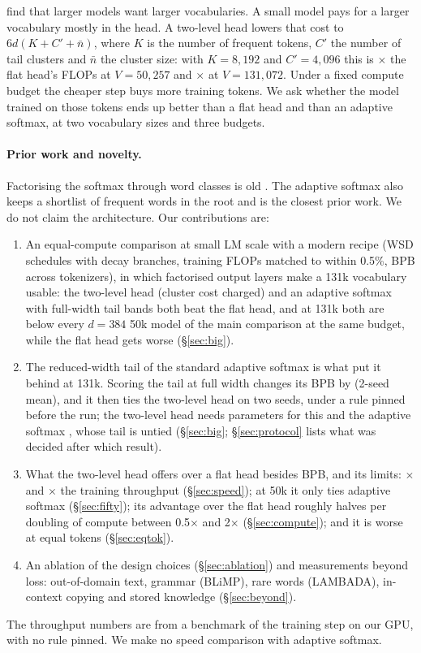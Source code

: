 \documentclass[11pt]{article}
\theoremstyle{remark}
\begin{document}
\citet{tao2024scaling} find that larger models want larger vocabularies. A small model
pays for a larger vocabulary mostly in the head. A two-level head lowers that cost to $6d(K + C' + \bar n)$, where $K$ is the
number of frequent tokens, $C'$ the number of tail clusters and $\bar n$ the cluster size: with $K = 8{,}192$ and $C' = 4{,}096$
this is \HeadRatioFifty{}$\times$ the flat head's FLOPs at $V = 50{,}257$ and \HeadRatioBig{}$\times$ at $V = 131{,}072$. Under
a fixed compute budget the cheaper step buys more training tokens. We ask whether the model trained on those tokens ends up
better than a flat head and than an adaptive softmax, at two vocabulary sizes and three budgets.

\paragraph{Prior work and novelty.} Factorising the softmax through word classes is old \citep{goodman2001classes,
morin2005hierarchical}. The adaptive softmax \citep{grave2017efficient} also keeps a shortlist of frequent words in the root and
is the closest prior work. We do not claim the architecture. Our contributions are:
\begin{enumerate}
  \item An equal-compute comparison at small LM scale with a modern recipe (WSD schedules with decay branches, training FLOPs
  matched to within 0.5\%, BPB across tokenizers), in which factorised output layers make a 131k vocabulary usable: the two-level
  head (cluster cost charged) and an adaptive softmax with full-width tail bands both beat the flat head, and at 131k both are below
  every $d=384$ 50k model of the main comparison at the same budget, while the flat head gets worse (\S\ref{sec:big}).
  \item The reduced-width tail of the standard adaptive softmax is what put it behind at 131k. Scoring the tail at full width
  changes its BPB by \BigWidMean{} (2-seed mean), and it then ties the two-level head on two seeds, under a rule pinned before the run; the
  two-level head needs \ParamsTlBig{} parameters for this and the adaptive softmax \ParamsAsBigW{}, whose tail is untied (\S\ref{sec:big};
  \S\ref{sec:protocol} lists what was decided after which result).
  \item What the two-level head offers over a flat head besides BPB, and its limits: \PerfRatioFifty{}$\times$ and
  \PerfRatioBig{}$\times$ the training throughput (\S\ref{sec:speed}); at 50k it only ties adaptive softmax (\S\ref{sec:fifty});
  its advantage over the flat head roughly halves per doubling of compute between 0.5$\times$ and 2$\times$
  (\S\ref{sec:compute}); and it is worse at equal tokens (\S\ref{sec:eqtok}).
  \item An ablation of the design choices (\S\ref{sec:ablation}) and measurements beyond loss: out-of-domain text, grammar
  (BLiMP), rare words (LAMBADA), in-context copying and stored knowledge (\S\ref{sec:beyond}).
\end{enumerate}
The throughput numbers are from a benchmark of the training step on our GPU, with no rule pinned. We make no speed comparison
with adaptive softmax.
\end{document}
